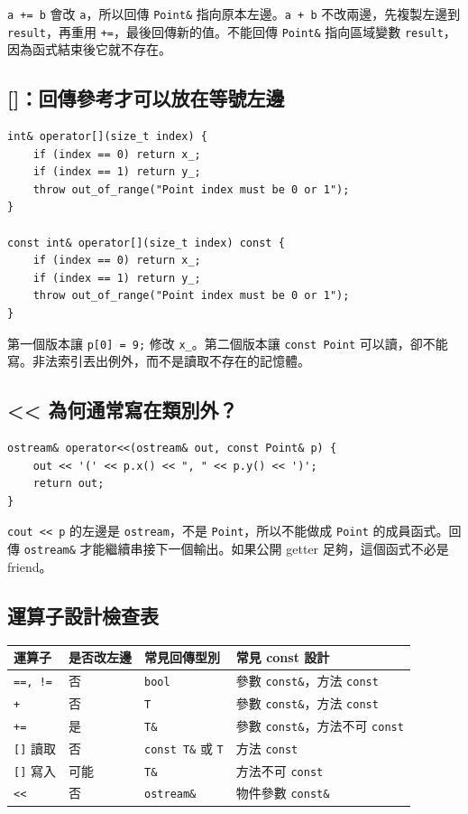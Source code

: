\documentclass[11pt,a4paper]{article}
\newcommand{\code}[1]{\texttt{#1}}
\begin{document}
\code{a += b} 會改 \code{a}，所以回傳 \code{Point\&} 指向原本左邊。\code{a + b} 不改兩邊，先複製左邊到 \code{result}，再重用 \code{+=}，最後回傳新的值。不能回傳 \code{Point\&} 指向區域變數 \code{result}，因為函式結束後它就不存在。

\subsection{[]：回傳參考才可以放在等號左邊}

\begin{lstlisting}
int& operator[](size_t index) {
    if (index == 0) return x_;
    if (index == 1) return y_;
    throw out_of_range("Point index must be 0 or 1");
}

const int& operator[](size_t index) const {
    if (index == 0) return x_;
    if (index == 1) return y_;
    throw out_of_range("Point index must be 0 or 1");
}
\end{lstlisting}

第一個版本讓 \code{p[0] = 9;} 修改 \code{x\_}。第二個版本讓 \code{const Point} 可以讀，卻不能寫。非法索引丟出例外，而不是讀取不存在的記憶體。

\subsection{<< 為何通常寫在類別外？}

\begin{lstlisting}
ostream& operator<<(ostream& out, const Point& p) {
    out << '(' << p.x() << ", " << p.y() << ')';
    return out;
}
\end{lstlisting}

\code{cout << p} 的左邊是 \code{ostream}，不是 \code{Point}，所以不能做成 \code{Point} 的成員函式。回傳 \code{ostream\&} 才能繼續串接下一個輸出。如果公開 getter 足夠，這個函式不必是 friend。

\subsection{運算子設計檢查表}

\begin{longtable}{p{20mm}p{40mm}p{42mm}p{40mm}}
\toprule
運算子 & 是否改左邊 & 常見回傳型別 & 常見 const 設計 \\
\midrule
\endhead
\code{==, !=} & 否 & \code{bool} & 參數 \code{const\&}，方法 \code{const} \\
\code{+} & 否 & \code{T} & 參數 \code{const\&}，方法 \code{const} \\
\code{+=} & 是 & \code{T\&} & 參數 \code{const\&}，方法不可 \code{const} \\
\code{[]} 讀取 & 否 & \code{const T\&} 或 \code{T} & 方法 \code{const} \\
\code{[]} 寫入 & 可能 & \code{T\&} & 方法不可 \code{const} \\
\code{<<} & 否 & \code{ostream\&} & 物件參數 \code{const\&} \\
\bottomrule
\end{longtable}
\end{document}
